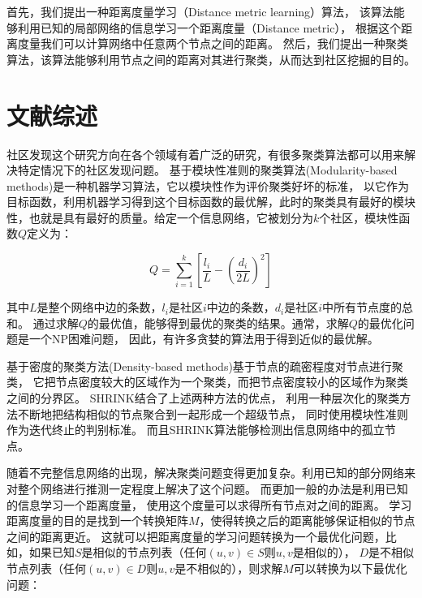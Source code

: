 首先，我们提出一种距离度量学习（Distance metric learning）算法，
该算法能够利用已知的局部网络的信息学习一个距离度量（Distance metric），
根据这个距离度量我们可以计算网络中任意两个节点之间的距离。
然后，我们提出一种聚类算法，该算法能够利用节点之间的距离对其进行聚类，从而达到社区挖掘的目的。

\section{文献综述}

社区发现这个研究方向在各个领域有着广泛的研究，有很多聚类算法都可以用来解决特定情况下的社区发现问题。
基于模块性准则的聚类算法(Modularity-based methods)是一种机器学习算法，它以模块性作为评价聚类好坏的标准，
以它作为目标函数，利用机器学习得到这个目标函数的最优解，此时的聚类具有最好的模块性，也就是具有最好的质量。给定一个信息网络，它被划分为$k$个社区，模块性函数$Q$定义为：

\begin{equation}
Q = \sum_{i=1}^{k}[ \frac{l_i}{L} - (\frac{d_i}{2L})^2]
\end{equation}

其中$L$是整个网络中边的条数，$l_i$是社区$i$中边的条数，$d_i$是社区$i$中所有节点度的总和。
通过求解$Q$的最优值，能够得到最优的聚类的结果。通常，求解$Q$的最优化问题是一个NP困难问题，
因此，有许多贪婪的算法用于得到近似的最优解。

基于密度的聚类方法(Density-based methods)基于节点的疏密程度对节点进行聚类，
它把节点密度较大的区域作为一个聚类，而把节点密度较小的区域作为聚类之间的分界区。
SHRINK结合了上述两种方法的优点，
利用一种层次化的聚类方法不断地把结构相似的节点聚合到一起形成一个超级节点，
同时使用模块性准则作为迭代终止的判别标准。
而且SHRINK算法能够检测出信息网络中的孤立节点。

随着不完整信息网络的出现，解决聚类问题变得更加复杂。利用已知的部分网络来对整个网络进行推测一定程度上解决了这个问题。
而更加一般的办法是利用已知的信息学习一个距离度量，
使用这个度量可以求得所有节点对之间的距离。
学习距离度量的目的是找到一个转换矩阵$M$，使得转换之后的距离能够保证相似的节点之间的距离更近。
这就可以把距离度量的学习问题转换为一个最优化问题，比如，如果已知$S$是相似的节点列表（任何$(u, v) \in S$则$u, v$是相似的），
$D$是不相似节点列表（任何$(u, v) \in D$则$u, v$是不相似的），则求解$M$可以转换为以下最优化问题：

